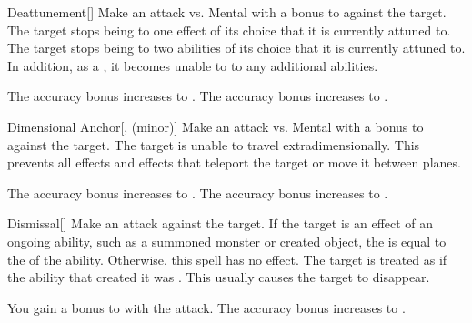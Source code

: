 \lowercase{\hypertarget{spell:Deattunement}{}}\label{spell:Deattunement}
\begin{freeability}[Rank 3]{\hypertarget{spell:Deattunement}{Deattunement}}[]
Make an attack vs. Mental with a  bonus to  against the target.
\hit The target stops being  to one effect of its choice that it is currently attuned to.
\crit The target stops being  to two abilities of its choice that it is currently attuned to.
In addition, as a , it becomes unable to  to any additional abilities.

\rankline
{} The accuracy bonus increases to .
 The accuracy bonus increases to .

\end{freeability}
\vspace{0.25em}



\lowercase{\hypertarget{spell:Dimensional Anchor}{}}\label{spell:Dimensional Anchor}
\begin{freeability}[Rank 3]{\hypertarget{spell:Dimensional Anchor}{Dimensional Anchor}}[,  (minor)]
Make an attack vs. Mental with a  bonus to  against the target.
\hit The target is unable to travel extradimensionally.
This prevents all  effects and effects that teleport the target or move it between planes.

\rankline
{} The accuracy bonus increases to .
 The accuracy bonus increases to .

\end{freeability}
\vspace{0.25em}



\lowercase{\hypertarget{spell:Dismissal}{}}\label{spell:Dismissal}
\begin{freeability}[Rank 3]{\hypertarget{spell:Dismissal}{Dismissal}}[]
Make an attack against the target.
If the target is an effect of an ongoing  ability, such as a summoned monster or created object, the  is equal to the  of the ability.
Otherwise, this spell has no effect.
\hit The target is treated as if the ability that created it was .
This usually causes the target to disappear.

\rankline
{} You gain a  bonus to  with the attack.
 The accuracy bonus increases to .

\end{freeability}
\vspace{0.25em}



